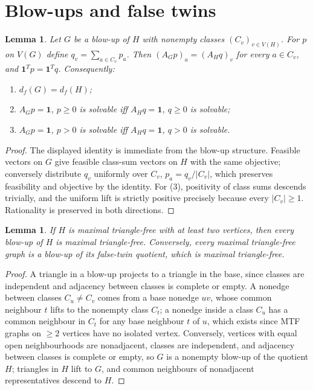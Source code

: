 \documentclass[11pt]{article}
\newtheorem{lemma}[theorem]{Lemma}
\theoremstyle{definition}
\theoremstyle{remark}
\newcommand{\df}{d_f}
\newcommand{\ones}{\mathbf 1}
\begin{document}
\section{Blow-ups and false twins}

\begin{lemma}\label{lem:blowup}
Let $G$ be a blow-up of $H$ with nonempty classes $(C_v)_{v\in V(H)}$. For $p$ on $V(G)$
define $q_v=\sum_{a\in C_v}p_a$. Then $(A_Gp)_a=(A_Hq)_v$ for every $a\in C_v$, and
$\ones^Tp=\ones^Tq$. Consequently:
\begin{enumerate}
\item $\df(G)=\df(H)$;
\item $A_Gp=\ones$, $p\ge0$ is solvable iff $A_Hq=\ones$, $q\ge0$ is solvable;
\item $A_Gp=\ones$, $p>0$ is solvable iff $A_Hq=\ones$, $q>0$ is solvable.
\end{enumerate}
\end{lemma}

\begin{proof}
The displayed identity is immediate from the blow-up structure. Feasible vectors on $G$ give
feasible class-sum vectors on $H$ with the same objective; conversely distribute $q_v$
uniformly over $C_v$, $p_a=q_v/|C_v|$, which preserves feasibility and objective by the
identity. For (3), positivity of class sums descends trivially, and the uniform lift is
strictly positive precisely because every $|C_v|\ge1$. Rationality is preserved in both
directions.
\end{proof}

\begin{lemma}\label{lem:mtf}
If $H$ is maximal triangle-free with at least two vertices, then every blow-up of $H$ is
maximal triangle-free. Conversely, every maximal triangle-free graph is a blow-up of its
false-twin quotient, which is maximal triangle-free.
\end{lemma}

\begin{proof}
A triangle in a blow-up projects to a triangle in the base, since classes are independent
and adjacency between classes is complete or empty. A nonedge between classes $C_u\ne C_v$
comes from a base nonedge $uv$, whose common neighbour $t$ lifts to the nonempty class
$C_t$; a nonedge inside a class $C_u$ has a common neighbour in $C_t$ for any base
neighbour $t$ of $u$, which exists since MTF graphs on $\ge2$ vertices have no isolated
vertex. Conversely, vertices with equal open neighbourhoods are nonadjacent, classes are
independent, and adjacency between classes is complete or empty, so $G$ is a nonempty
blow-up of the quotient $H$; triangles in $H$ lift to $G$, and common neighbours of
nonadjacent representatives descend to $H$.
\end{proof}
\end{document}
